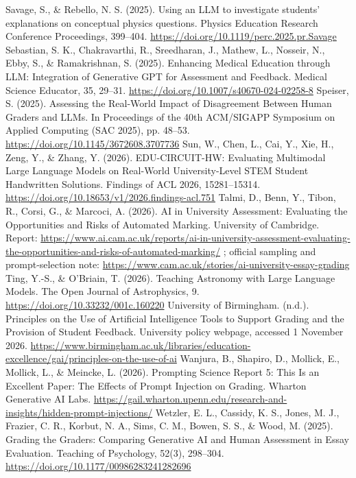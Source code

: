  Savage, S., \& Rebello, N. S. (2025). Using an LLM to investigate students' explanations on conceptual physics questions. Physics Education Research Conference Proceedings, 399--404. \url{https://doi.org/10.1119/perc.2025.pr.Savage}
 Sebastian, S. K., Chakravarthi, R., Sreedharan, J., Mathew, L., Nosseir, N., Ebby, S., \& Ramakrishnan, S. (2025). Enhancing Medical Education through LLM: Integration of Generative GPT for Assessment and Feedback. Medical Science Educator, 35, 29--31. \url{https://doi.org/10.1007/s40670-024-02258-8}
 Speiser, S. (2025). Assessing the Real-World Impact of Disagreement Between Human Graders and LLMs. In Proceedings of the 40th ACM/SIGAPP Symposium on Applied Computing (SAC 2025), pp. 48--53. \url{https://doi.org/10.1145/3672608.3707736}
 Sun, W., Chen, L., Cai, Y., Xie, H., Zeng, Y., \& Zhang, Y. (2026). EDU-CIRCUIT-HW: Evaluating Multimodal Large Language Models on Real-World University-Level STEM Student Handwritten Solutions. Findings of ACL 2026, 15281--15314. \url{https://doi.org/10.18653/v1/2026.findings-acl.751}
 Talmi, D., Benn, Y., Tibon, R., Corsi, G., \& Marcoci, A. (2026). AI in University Assessment: Evaluating the Opportunities and Risks of Automated Marking. University of Cambridge. Report: \url{https://www.ai.cam.ac.uk/reports/ai-in-university-assessment-evaluating-the-opportunities-and-risks-of-automated-marking/} ; official sampling and prompt-selection note: \url{https://www.cam.ac.uk/stories/ai-university-essay-grading}
 Ting, Y.-S., \& O'Briain, T. (2026). Teaching Astronomy with Large Language Models. The Open Journal of Astrophysics, 9. \url{https://doi.org/10.33232/001c.160220}
 University of Birmingham. (n.d.). Principles on the Use of Artificial Intelligence Tools to Support Grading and the Provision of Student Feedback. University policy webpage, accessed 1 November 2026. \url{https://www.birmingham.ac.uk/libraries/education-excellence/gai/principles-on-the-use-of-ai}
 Wanjura, B., Shapiro, D., Mollick, E., Mollick, L., \& Meincke, L. (2026). Prompting Science Report 5: This Is an Excellent Paper: The Effects of Prompt Injection on Grading. Wharton Generative AI Labs. \url{https://gail.wharton.upenn.edu/research-and-insights/hidden-prompt-injections/}
 Wetzler, E. L., Cassidy, K. S., Jones, M. J., Frazier, C. R., Korbut, N. A., Sims, C. M., Bowen, S. S., \& Wood, M. (2025). Grading the Graders: Comparing Generative AI and Human Assessment in Essay Evaluation. Teaching of Psychology, 52(3), 298--304. \url{https://doi.org/10.1177/00986283241282696}
